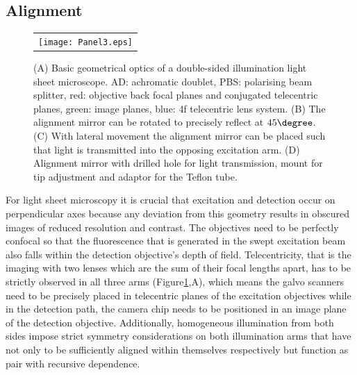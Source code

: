\documentclass[12pt]{spieman}  %
\begin{document}
	\subsection{Alignment}

\begin{figure}
   \begin{center}
   \begin{tabular}{c}
   \texttt{[image: Panel3.eps]}
   \end{tabular}
   \end{center}
   \caption{\label{fig:alignment} (A) Basic geometrical optics of a double-sided illumination light sheet microscope. AD: achromatic doublet, PBS: polarising beam splitter, red: objective back focal planes and conjugated telecentric planes, green: image planes, blue: 4f telecentric lens system. (B) The alignment mirror can be rotated to precisely reflect at $45\degree$. (C) With lateral movement the alignment mirror can be placed such that light is transmitted into the opposing excitation arm. (D) Alignment mirror with drilled hole for light transmission, mount for tip adjustment and adaptor for the Teflon tube.} 
   \end{figure}

For light sheet microscopy it is crucial that excitation and detection occur on perpendicular axes because any deviation from this geometry results in obscured images of reduced resolution and contrast. The objectives need to be perfectly confocal so that the fluorescence that is generated in the swept excitation beam also falls within the detection objective's depth of field. Telecentricity, that is the imaging with two lenses which are the sum of their focal lengths apart, has to be strictly observed in all three arms (Figure\ref{fig:alignment},A), which means the galvo scanners need to be precisely placed in telecentric planes of the excitation objectives while in the detection path, the camera chip needs to be positioned in an image plane of the detection objective. Additionally, homogeneous illumination from both sides impose strict symmetry considerations on both illumination arms that have not only to be sufficiently aligned within themselves respectively but function as pair with recursive dependence. 
\end{document}
